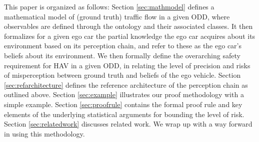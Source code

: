 This paper is organized as follows: 
Section \ref{sec:mathmodel} defines a mathematical model of (ground truth) traffic flow in a given ODD, where observables are defined through the ontology and their associated classes. It then formalizes for a given ego car the partial knowledge the ego car acquires about its environment based on its perception chain, and refer to these as the ego car's beliefs about its environment. We then formally define the overarching safety requirement for HAV in a given ODD, in relating the level of precision and risks of misperception between ground truth and beliefs of the ego vehicle. Section \ref{sec:refarchitecture} defines the reference architecture of the perception chain as outlined above.
Section \ref{sec:example} illustrates our proof methodology with a simple example. Section \ref{sec:proofrule} contains the formal proof rule and key elements of the underlying statistical arguments for bounding the level of risk. Section \ref{sec:relatedwork} discusses related work. We wrap up with a way forward in using this methodology.


